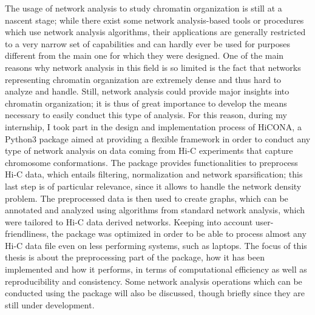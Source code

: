 The usage of network analysis to study chromatin organization is still at a nascent stage; while there exist some network analysis-based tools or procedures which use network analysis algorithms, their applications are generally restricted to a very narrow set of capabilities and can hardly ever be used for purposes different from the main one for which they were designed. One of the main reasons why network analysis in this field is so limited is the fact that networks representing chromatin organization are extremely dense and thus hard to analyze and handle. Still, network analysis could provide major insights into chromatin organization; it is thus of great importance to develop the means necessary to easily conduct this type of analysis. For this reason, during my internship, I took part in the design and implementation process of HiCONA, a Python3 package aimed at providing a flexible framework in order to conduct any type of network analysis on data coming from Hi-C experiments that capture chromosome conformations. The package provides functionalities to preprocess Hi-C data, which entails filtering, normalization and network sparsification; this last step is of particular relevance, since it allows to handle the network density problem. The preprocessed data is then used to create graphs, which can be annotated and analyzed using algorithms from standard network analysis, which were tailored to Hi-C data derived networks. Keeping into account user-friendliness, the package was optimized in order to be able to process almost any Hi-C data file even on less performing systems, such as laptops. The focus of this thesis is about the preprocessing part of the package, how it has been implemented and how it performs, in terms of computational efficiency as well as reproducibility and consistency. Some network analysis operations which can be conducted using the package will also be discussed, though briefly since they are still under development.
